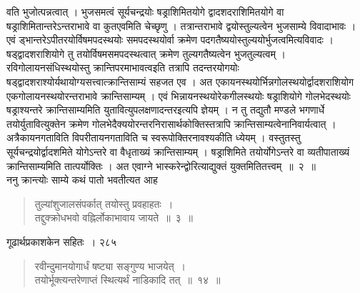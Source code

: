 \documentclass[11pt, openany]{book}
\begin{document}
%
\noindent वति भुजोत्पन्नत्वात् । भुजसमत्वं सूर्यचन्द्रयोः षड्राशिमितयोगे द्वादशदराशिमितयोगे वा षड्राशिमितान्तरेऽन्तराभावे वा कुतएवमिति चेच्छृणु । तत्रान्तराभावे द्वयोस्तुल्यत्वेन भुजसाम्ये विवादाभावः । एवं ड्भान्तरेऽपीतरयोर्विषमपदस्थयोः समपदस्थयोर्वा क्रमेण पदगतैष्ययोस्तुल्ययोर्भुजत्वमित्यविवादः । षड्द्वादशराशियोगे तु तयोर्विषमसमपदस्थत्वात् क्रमेण तुल्यगतैष्यत्वेन भुजतुल्यत्वम् । रविगोलायनसंधिस्थयोस्तु क्रान्तिपरमाभावत्वइति तत्रापि तदन्तरयोगयोः षड्द्वादशराश्योर्यथायोग्यसत्त्वात्क्रान्तिसाम्यं सहजत एव । अत एकायनस्थयोर्भिन्नगोलस्थयोर्द्वादशराशियोग एकगोलायनस्थयोरन्तराभावे क्रान्तिसाम्यम् । एवं भिन्नायनस्थयोरेकगीलस्थयोः षड्राशियोगे गोलभेदस्थयोः षड्राश्यन्तरे क्रान्तिसाम्यमिति युतावित्युपलक्षणादन्तरइत्यपि ज्ञेयम् । न तु तद्युतौ मण्डले भगणार्धे तयोर्युतावित्युक्तेन क्रमेण गोलभेदैक्ययोरन्तरनिरासार्थकोक्तिस्तत्रापि क्रान्तिसाम्यत्वेनानिवार्यत्वात् । अत्रैकायनगताविति विपरीतायनगताविति च स्वरूपोक्तिरनावश्यकीति ध्येयम् । वस्तुतस्तु सूर्यचन्द्रयोर्द्वादशमिते योगेऽन्तरे वा वैधृताख्यं क्रान्तिसाम्यम् । षड्राशिमिते तयोर्योगेऽन्तरे वा व्यतीपाताख्यं क्रान्तिसाम्यमिति तात्पर्योक्तिः । अत एवाग्ने भास्करेन्द्वोरित्याद्युक्तं युक्तमितितत्त्वम्~॥~२~॥\\
\noindent ननु क्रान्त्योः साम्ये कथं पातो भवतीत्यत आह \textendash

\begin{quote}
{\ssi तुल्यांशुजालसंपर्कात् तयोस्तु प्रवहाहतः~।\\
तद्दुक्क्रोधभवो वह्निर्लोकाभावाय जायते~॥~३~॥}
\end{quote}
%

\newpage

\hspace{3cm} गूढार्थप्रकाशकेन सहितः~। \hfill २८५
\vspace{1cm}


 
\begin{quote}
{\ssi  रवीन्दुमानयोगार्धं षष्ट्या सङ्गुण्य भाजयेत्~।\\
 तयोर्भूक्त्यन्तरेणाप्तं स्थित्यर्थं नाडिकादि तत्~॥~१४~॥ }
\end{quote}
\end{document}
